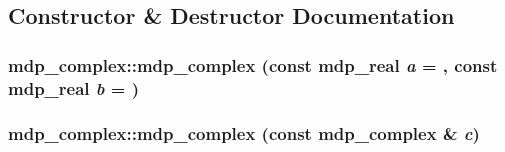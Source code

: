 \subsection{Constructor \& Destructor Documentation}
\hypertarget{classmdp__complex_aeb3ec4ef78af98be64dc82c9a2105820}{
\subsubsection[{mdp\_\-complex}]{\setlength{\rightskip}{0pt plus 5cm}mdp\_\-complex::mdp\_\-complex (const {\bf mdp\_\-real} {\em a} = {}, \/  const {\bf mdp\_\-real} {\em b} = {})}}
\label{classmdp__complex_aeb3ec4ef78af98be64dc82c9a2105820}
\hypertarget{classmdp__complex_a99833fa0efd97e5a5d95afd237ac5c7c}{
\subsubsection[{mdp\_\-complex}]{\setlength{\rightskip}{0pt plus 5cm}mdp\_\-complex::mdp\_\-complex (const {\bf mdp\_\-complex} \& {\em c})}}
\label{classmdp__complex_a99833fa0efd97e5a5d95afd237ac5c7c}


